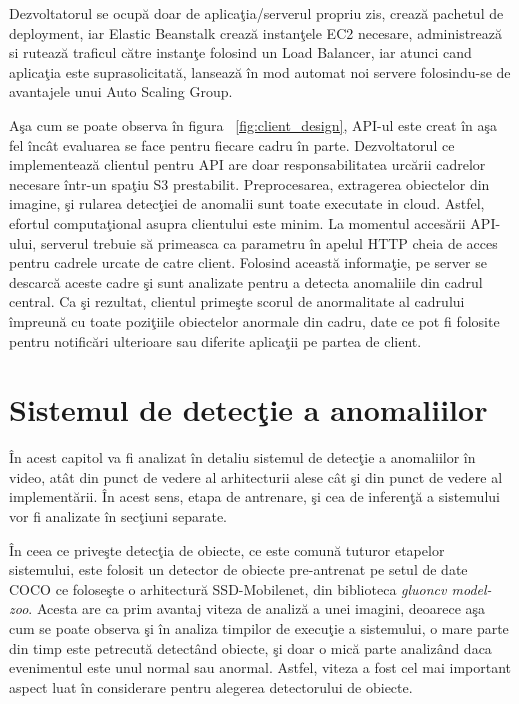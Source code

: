 \documentclass[a4paper,12pt]{report}
\begin{document}
Dezvoltatorul se ocupă doar de aplicaţia/serverul propriu zis, crează pachetul de deployment, iar Elastic Beanstalk crează instanţele EC2 necesare, administrează si rutează traficul către instanţe folosind un Load Balancer, iar atunci cand aplicaţia este suprasolicitată, lansează în mod automat noi servere folosindu-se de avantajele unui Auto Scaling Group.
\par Aşa cum se poate observa în figura ~\ref{fig:client_design}, API-ul este creat în aşa fel încât evaluarea se face pentru fiecare cadru în parte. Dezvoltatorul ce implementează clientul pentru API are doar responsabilitatea urcării cadrelor necesare într-un spaţiu S3 prestabilit. Preprocesarea, extragerea obiectelor din imagine, şi rularea detecţiei de anomalii sunt toate executate in cloud. Astfel, efortul computaţional asupra clientului este minim. La momentul accesării API-ului, serverul trebuie să primeasca ca parametru în apelul HTTP cheia de acces pentru cadrele urcate de catre client. Folosind această informaţie, pe server se descarcă aceste cadre şi sunt analizate pentru a detecta anomaliile din cadrul central. Ca şi rezultat, clientul primeşte scorul de anormalitate al cadrului împreună cu toate poziţiile obiectelor anormale din cadru, date ce pot fi folosite pentru notificări ulterioare sau diferite aplicaţii pe partea de client. 

\chapter{Sistemul de detecţie a anomaliilor}
\quad În acest capitol va fi analizat în detaliu sistemul de detecţie a anomaliilor în video, atât din punct de vedere al arhitecturii alese cât şi din punct de vedere al implementării. În acest sens, etapa de antrenare, şi cea de inferenţă a sistemului vor fi analizate în secţiuni separate.
\par În ceea ce priveşte detecţia de obiecte, ce este comună tuturor etapelor sistemului, este folosit un detector de obiecte pre-antrenat pe setul de date COCO ce foloseşte o arhitectură SSD-Mobilenet, din biblioteca \emph {gluoncv model-zoo}. Acesta are ca prim avantaj viteza de analiză a unei imagini, deoarece aşa cum se poate observa şi în analiza timpilor de execuţie a sistemului, o mare parte din timp este petrecută detectând obiecte, şi doar o mică parte analizând daca evenimentul este unul normal sau anormal. Astfel, viteza a fost cel mai important aspect luat în considerare pentru alegerea detectorului de obiecte.
\end{document}

